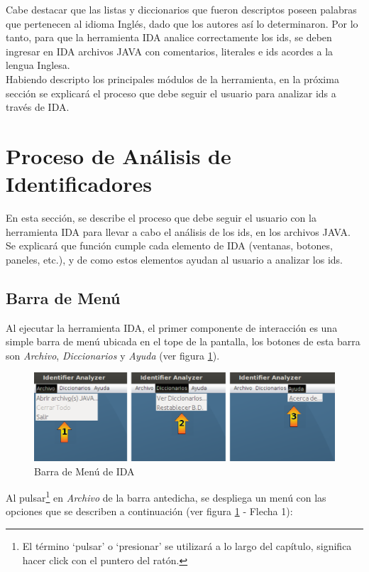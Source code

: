 Cabe destacar que las listas y diccionarios que fueron descriptos poseen palabras que pertenecen al idioma Inglés, dado que los autores así lo determinaron. Por lo tanto, para que la herramienta IDA analice correctamente los ids, se deben ingresar en IDA archivos JAVA con comentarios, literales e ids acordes a la lengua Inglesa.\\ 

Habiendo descripto los principales módulos de la herramienta, en la próxima sección se explicará el proceso que debe seguir el usuario para analizar ids a través de IDA.
 
\section{Proceso de Análisis de Identificadores}

En esta sección, se describe el proceso que debe seguir el usuario con la herramienta IDA para llevar a cabo el análisis de los ids, en los archivos JAVA. Se explicará que función cumple cada elemento de IDA (ventanas, botones, paneles, etc.), y de como estos elementos ayudan al usuario a analizar los ids.

\subsection{Barra de Menú}

Al ejecutar la herramienta IDA, el primer componente de interacción es una simple barra de menú ubicada en el tope de la pantalla, los botones de esta barra son \textit{Archivo}, \textit{Diccionarios} y \textit{Ayuda} (ver figura \ref{ida1}). 

\begin{figure}[t] %
\centerline{%
\includegraphics[scale= 0.46]{./cap4/ida_01.png}
}
\caption{Barra de Menú de IDA}
\label{ida1}
\end{figure}

Al pulsar\footnote[1]{El término `pulsar' o `presionar' se utilizará a lo largo del capítulo, significa hacer click con el puntero del ratón.} en \textit{Archivo} de la barra antedicha, se despliega un menú con las opciones que se describen a continuación (ver figura \ref{ida1} - Flecha 1):


